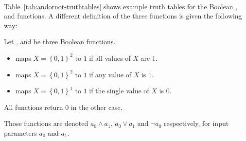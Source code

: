 \begin{table}[pt]
  \centering
  ~
  ~
  \caption{Truth tables for ,  and }
  \label{tab:andornot-truthtables}
\end{table}

Table~\ref{tab:andornot-truthtables} shows example truth tables for
the Boolean ,  and  functions.
A different definition of the three functions is given the following way:

\begin{defi}
  Let ,  and  be three Boolean functions.
  \begin{itemize}[noitemsep,topsep=0pt]
    \item
       maps $X = \left\{0,1\right\}^2$
      to $1$ if all values of $X$ are $1$.
    \item
       maps $X = \left\{0,1\right\}^2$
      to $1$ if any value of $X$ is $1$.
    \item
       maps $X = \left\{0,1\right\}^1$
      to $1$ if the single value of $X$ is $0$.
  \end{itemize}
  All functions return $0$ in the other case.

  Those functions are denoted $a_0 \land a_1$, $a_0 \lor a_1$
  and $\neg a_0$ respectively, for input parameters $a_0$ and $a_1$.
\end{defi}

